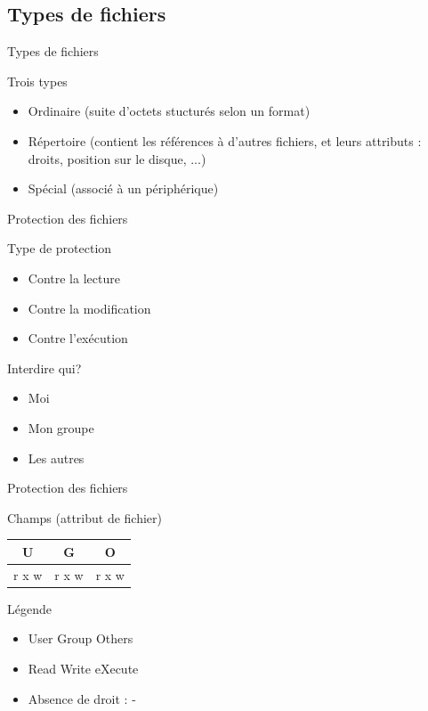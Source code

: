 \subsection{Types de fichiers}
\begin{frame}{Types de fichiers}
\begin{block}{Trois types}
\begin{itemize}
\item Ordinaire (suite d'octets stucturés selon un format)
\item Répertoire (contient les références à d'autres fichiers, et leurs attributs : droits, position sur le disque, ...)
\item Spécial  (associé à un périphérique)
\end{itemize}
\end{block}
\end{frame}

\begin{frame}{Protection des fichiers}
\begin{block}{Type de protection}
\begin{itemize}
\item Contre la lecture
\item Contre la modification
\item Contre l'exécution
\end{itemize}
\end{block}

\begin{block}{Interdire qui?}
\begin{itemize}
\item  Moi
\item  Mon groupe
\item Les autres
\end{itemize}
\end{block}

\end{frame}

\begin{frame}{Protection des fichiers}

\begin{block}{Champs (attribut de fichier)}
\begin{center}
\begin{tabular}{|c|c|c|}
\hline
U & G & O\\
\hline
r x w & r x w & r x w \\
\hline
\end{tabular}
\end{center}
\end{block}

\begin{block}{Légende}
\begin{itemize}
\item  User Group Others
\item  Read Write eXecute
\item  Absence de droit : -
\end{itemize}
\end{block}

\end{frame}


